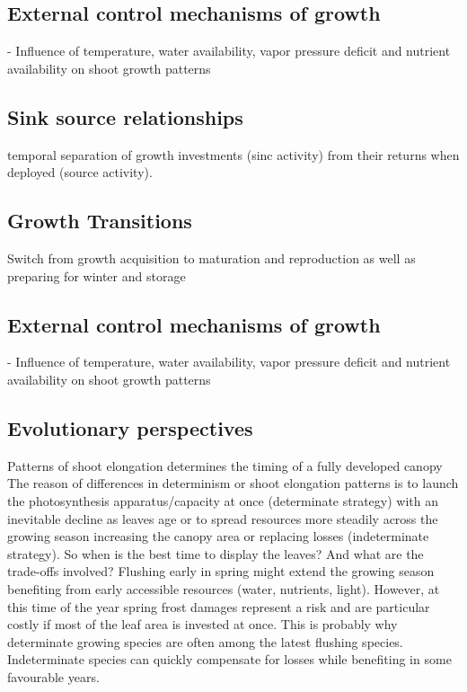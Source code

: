 \documentclass{article}
\begin{document}
	
	\subsection*{External control mechanisms of growth}
	- Influence of temperature, water availability, vapor pressure deficit and nutrient availability on shoot growth patterns\\
	
	\subsection*{Sink source relationships}
	temporal separation of growth investments (sinc activity) from their returns when deployed (source activity). \\
	
	\subsection*{Growth Transitions}
	Switch from growth acquisition to maturation and reproduction as well as preparing for winter and storage\\
	
	
	\subsection*{External control mechanisms of growth}
	- Influence of temperature, water availability, vapor pressure deficit and nutrient availability on shoot growth patterns\\
	
	\subsection*{Evolutionary perspectives}
	Patterns of shoot elongation determines the timing of a fully developed canopy\\
	The reason of differences in determinism or shoot elongation patterns is to launch the photosynthesis apparatus/capacity at once (determinate strategy) with an inevitable decline as leaves age or to spread resources more steadily across the growing season increasing the canopy area or replacing losses (indeterminate strategy). So when is the best time to display the leaves? And what are the trade-offs involved? Flushing early in spring might extend the growing season benefiting from early accessible resources (water, nutrients, light). However, at this time of the year spring frost damages represent a risk and are particular costly if most of the leaf area is invested at once. This is probably why determinate growing species are often among the latest flushing species. Indeterminate species can quickly compensate for losses while benefiting in some favourable years. \\
	
\end{document}
